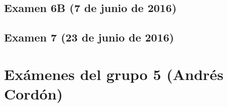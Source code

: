 \documentclass[a4paper,12pt,twoside]{book}
\begin{document}
\subsection{Examen 6B (7 de junio de 2016)} 
 \label{examen_15_16_4_6}
\subsection{Examen 7 (23 de junio de 2016)}
  \label{examen_15_16_4_7}

\section{Exámenes del grupo 5 (Andrés Cordón)}


\appendix %






\nocite{Alonso-12b}
\nocite{Bird-99a}
\nocite{Cunningham-10a}
\nocite{Daume-06}
\nocite{Davie-92a}
\nocite{Doets-04a}
\nocite{Fokker-96}
\nocite{Hudak-00a}
\nocite{Hudak-12a}
\nocite{Hutton-07a}
\nocite{OSullivan-08a}
\nocite{Rabhi-99a}
\nocite{Polya-65a}
\nocite{Ruiz-04}
\nocite{Thompson-11a}



\end{document}
